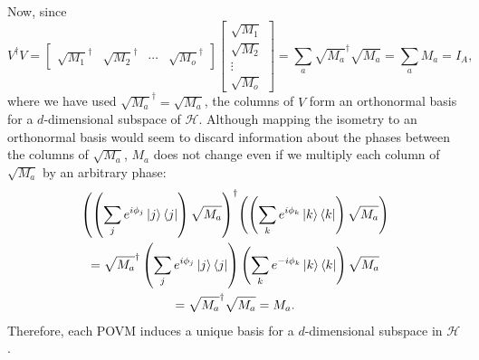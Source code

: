 \documentclass[10pt, a4paper]{article}
\numberwithin{equation}{section} %
\theoremstyle{definition}
\theoremstyle{plain}
\newcommand{\?}{\mathrel{?}} %
\newcommand{\Hs}{\mathcal{H}} %
\begin{document}
                        Now, since
                        \begin{equation}
                          V^{\dagger}V = \begin{bmatrix} \sqrt{M_1}^{\dagger} & \sqrt{M_2}^{\dagger} & \cdots & \sqrt{M_o}^{\dagger} \end{bmatrix} \begin{bmatrix} \sqrt{M_1} \\ \sqrt{M_2} \\ \vdots \\ \sqrt{M_o} \end{bmatrix} = \sum_a \sqrt{M_a}^{\dagger}\sqrt{M_a} = \sum_a M_a = I_A,
                        \end{equation}
                        where we have used \(\sqrt{M_a}^{\dagger} = \sqrt{M_a}\), the columns of \(V\) form an orthonormal basis for a \(d\)-dimensional subspace of \(\Hs\). Although mapping the isometry to an orthonormal basis would seem to discard information about the phases between the columns of \(\sqrt{M_a}\), \(M_a\) does not change even if we multiply each column of \(\sqrt{M_a}\) by an arbitrary phase:
                        \begin{gather}
                          {\left(\left(\sum_j e^{i\phi_j} \ket{j}\bra{j}\right)\sqrt{M_a}\right)}^{\dagger} {\left(\left(\sum_k e^{i\phi_k} \ket{k}\bra{k}\right)\sqrt{M_a}\right)} \\
                          = \sqrt{M_a}^{\dagger}\left(\sum_j e^{i\phi_j} \ket{j}\bra{j}\right) \left(\sum_k e^{-i\phi_k} \ket{k}\bra{k}\right)\sqrt{M_a} \\
                          = \sqrt{M_a}^{\dagger}\sqrt{M_a} = M_a.
                        \end{gather}
                        Therefore, each POVM induces a unique basis for a \(d\)-dimensional subspace in \(\Hs\).
\end{document}
